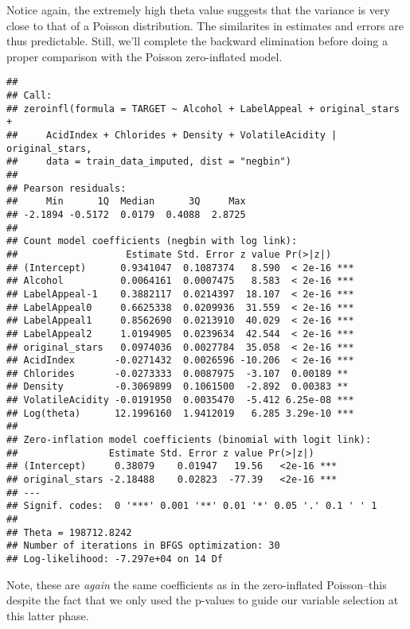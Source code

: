 \documentclass[
]{article}
\begin{document}
Notice again, the extremely high theta value suggests that the variance
is very close to that of a Poisson distribution. The similarites in
estimates and errors are thus predictable. Still, we'll complete the
backward elimination before doing a proper comparison with the Poisson
zero-inflated model.

\begin{verbatim}
## 
## Call:
## zeroinfl(formula = TARGET ~ Alcohol + LabelAppeal + original_stars + 
##     AcidIndex + Chlorides + Density + VolatileAcidity | original_stars, 
##     data = train_data_imputed, dist = "negbin")
## 
## Pearson residuals:
##     Min      1Q  Median      3Q     Max 
## -2.1894 -0.5172  0.0179  0.4088  2.8725 
## 
## Count model coefficients (negbin with log link):
##                   Estimate Std. Error z value Pr(>|z|)    
## (Intercept)      0.9341047  0.1087374   8.590  < 2e-16 ***
## Alcohol          0.0064161  0.0007475   8.583  < 2e-16 ***
## LabelAppeal-1    0.3882117  0.0214397  18.107  < 2e-16 ***
## LabelAppeal0     0.6625338  0.0209936  31.559  < 2e-16 ***
## LabelAppeal1     0.8562690  0.0213910  40.029  < 2e-16 ***
## LabelAppeal2     1.0194905  0.0239634  42.544  < 2e-16 ***
## original_stars   0.0974036  0.0027784  35.058  < 2e-16 ***
## AcidIndex       -0.0271432  0.0026596 -10.206  < 2e-16 ***
## Chlorides       -0.0273333  0.0087975  -3.107  0.00189 ** 
## Density         -0.3069899  0.1061500  -2.892  0.00383 ** 
## VolatileAcidity -0.0191950  0.0035470  -5.412 6.25e-08 ***
## Log(theta)      12.1996160  1.9412019   6.285 3.29e-10 ***
## 
## Zero-inflation model coefficients (binomial with logit link):
##                Estimate Std. Error z value Pr(>|z|)    
## (Intercept)     0.38079    0.01947   19.56   <2e-16 ***
## original_stars -2.18488    0.02823  -77.39   <2e-16 ***
## ---
## Signif. codes:  0 '***' 0.001 '**' 0.01 '*' 0.05 '.' 0.1 ' ' 1 
## 
## Theta = 198712.8242 
## Number of iterations in BFGS optimization: 30 
## Log-likelihood: -7.297e+04 on 14 Df
\end{verbatim}

Note, these are \emph{again} the same coefficients as in the
zero-inflated Poisson--this despite the fact that we only used the
p-values to guide our variable selection at this latter phase.
\end{document}

